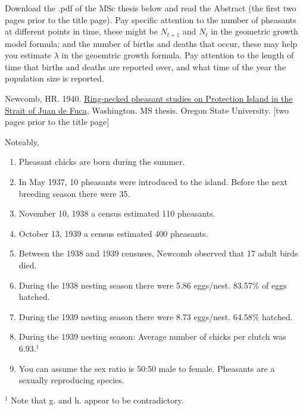 \documentclass[
]{book}
\providecommand{\tightlist}{%
  \setlength{\itemsep}{0pt}\setlength{\parskip}{0pt}}
\begin{document}
Download the .pdf of the MSc thesis below and read the Abstract (the first two pages prior to the title page). Pay specific attention to the number of pheasants at different points in time, these might be \(N_{t+1}\) and \(N_t\) in the geometric growth model formula; and the number of births and deaths that occur, these may help you estimate \(\lambda\) in the geoemtric growth formula. Pay attention to the length of time that births and deaths are reported over, and what time of the year the population size is reported.

Newcomb, HR. 1940. \href{https://ir.library.oregonstate.edu/concern/graduate_thesis_or_dissertations/js956j801?locale=en}{Ring-necked pheasant studies on Protection Island in the Strait of Juan de Fuca}, Washington. MS thesis. Oregon State University. {[}two pages prior to the title page{]}

Noteably,

\begin{enumerate}
\def\labelenumi{\alph{enumi}.}
\tightlist
\item
  Pheasant chicks are born during the summer.
\item
  In May 1937, 10 pheasants were introduced to the island. Before the next breeding season there were 35.
\item
  November 10, 1938 a census estimated 110 pheasants.
\item
  October 13, 1939 a census estimated 400 pheasants.
\item
  Between the 1938 and 1939 censuses, Newcomb observed that 17 adult birds died.
\item
  During the 1938 nesting season there were 5.86 eggs/nest. 83.57\% of eggs hatched.
\item
  During the 1939 nesting season there were 8.73 eggs/nest. 64.58\% hatched.
\item
  During the 1939 nesting season: Average number of chicks per clutch was 6.93.\(^1\)
\item
  You can assume the sex ratio is 50:50 male to female. Pheasants are a sexually reproducing species.
\end{enumerate}

\(^1\) Note that g. and h. appear to be contradictory.
\end{document}
